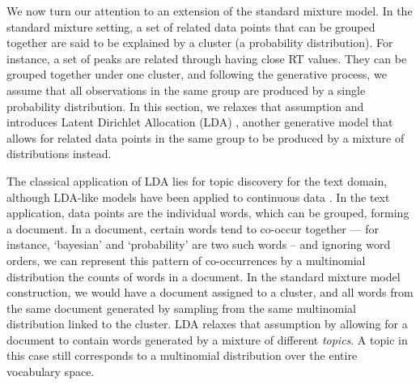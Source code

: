 We now turn our attention to an extension of the standard mixture model. In the standard mixture setting, a set of related data points that can be grouped together are said to be explained by a cluster (a probability distribution). For instance, a set of peaks are related through having close RT values. They can be grouped together under one cluster, and following the generative process, we assume that all observations in the same group are produced by a single probability distribution. In this section, we relaxes that assumption and introduces Latent Dirichlet Allocation (LDA) \cite{Blei2003}, another generative model that allows for related data points in the same group to be produced by a mixture of distributions instead.

The classical application of LDA lies for topic discovery for the text domain, although LDA-like models have been applied to continuous data \cite{rogers2005latent,weinshall2013lda,das2015gaussian}. In the text application, data points are the individual words, which can be grouped, forming a document. In a document, certain words tend to co-occur together --- for instance, `bayesian' and `probability' are two such words -- and ignoring word orders, we can represent this pattern of co-occurrences by a multinomial distribution the counts of words in a document. In the standard mixture model construction, we would have a document assigned to a cluster, and all words from the same document generated by sampling from the same multinomial distribution linked to the cluster. LDA relaxes that assumption by allowing for a document to contain words generated by a mixture of different \emph{topics}. A topic in this case still corresponds to a multinomial distribution over the entire vocabulary space.

